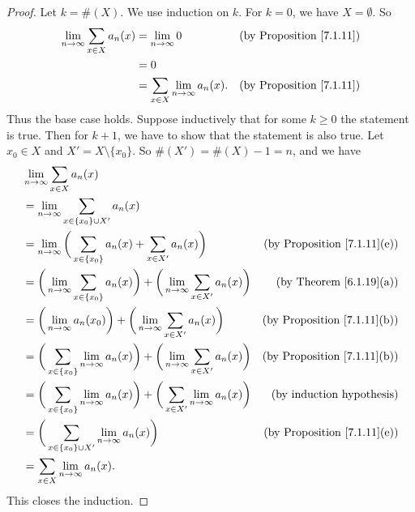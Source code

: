 \begin{proof}
    Let \(k = \#(X)\).
    We use induction on \(k\).
    For \(k = 0\), we have \(X = \emptyset\).
    So
    \begin{align*}
        \lim_{n \to \infty} \sum_{x \in X} a_n(x) & = \lim_{n \to \infty} 0                      & \text{(by Proposition \ref{7.1.11})} \\
                                                  & = 0                                                                                 \\
                                                  & = \sum_{x \in X} \lim_{n \to \infty} a_n(x). & \text{(by Proposition \ref{7.1.11})}
    \end{align*}
    Thus the base case holds.
    Suppose inductively that for some \(k \geq 0\) the statement is true.
    Then for \(k + 1\), we have to show that the statement is also true.
    Let \(x_0 \in X\) and \(X' = X \setminus \{x_0\}\).
    So \(\#(X') = \#(X) - 1 = n\), and we have
    \begin{align*}
         & \lim_{n \to \infty} \sum_{x \in X} a_n(x)                                                                                                                        \\
         & = \lim_{n \to \infty} \sum_{x \in \{x_0\} \cup X'} a_n(x)                                                                                                        \\
         & = \lim_{n \to \infty} \bigg(\sum_{x \in \{x_0\}} a_n(x) + \sum_{x \in X'} a_n(x)\bigg)                                 & \text{(by Proposition \ref{7.1.11}(e))} \\
         & = \bigg(\lim_{n \to \infty} \sum_{x \in \{x_0\}} a_n(x)\bigg) + \bigg(\lim_{n \to \infty} \sum_{x \in X'} a_n(x)\bigg) & \text{(by Theorem \ref{6.1.19}(a))}     \\
         & = \bigg(\lim_{n \to \infty} a_n(x_0)\bigg) + \bigg(\lim_{n \to \infty} \sum_{x \in X'} a_n(x)\bigg)                    & \text{(by Proposition \ref{7.1.11}(b))} \\
         & = \bigg(\sum_{x \in \{x_0\}} \lim_{n \to \infty} a_n(x)\bigg) + \bigg(\lim_{n \to \infty} \sum_{x \in X'} a_n(x)\bigg) & \text{(by Proposition \ref{7.1.11}(b))} \\
         & = \bigg(\sum_{x \in \{x_0\}} \lim_{n \to \infty} a_n(x)\bigg) + \bigg(\sum_{x \in X'} \lim_{n \to \infty} a_n(x)\bigg) & \text{(by induction hypothesis)}        \\
         & = \bigg(\sum_{x \in \{x_0\} \cup X'} \lim_{n \to \infty} a_n(x)\bigg)                                                  & \text{(by Proposition \ref{7.1.11}(e))} \\
         & = \sum_{x \in X} \lim_{n \to \infty} a_n(x).
    \end{align*}
    This closes the induction.
\end{proof}